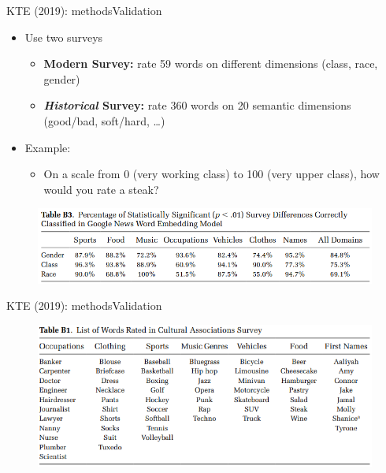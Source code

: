 \documentclass[usenames,dvipsnames,english]{beamer}
\begin{document}
\begin{frame}{KTE (2019): methods}{Validation}
    \begin{itemize}
    \setlength{\itemsep}{1.5em}
        \item Use two surveys
        \begin{itemize}
\vspace{10pt}
        \setlength{\itemsep}{1.2em}
            \item \textbf{Modern Survey:} rate 59 words on different dimensions (class, race, gender)
            \item \textbf{\textit{Historical} Survey:} rate 360 words on 20 semantic dimensions (good/bad, soft/hard, \dots)
        \end{itemize}

        \item Example:
        \begin{itemize}
            \item On a scale from 0 (very working class) to 100 (very upper class), how would you rate a steak?
        \end{itemize}
    \end{itemize}
\begin{figure}
    \centering
    \includegraphics[scale = 0.4]{Images/kte_validationturk.png}
    \end{figure}
\end{frame}
\begin{frame}{KTE (2019): methods}{Validation}
\begin{figure}
    \centering
    \includegraphics[scale = 0.6]{Images/kte_validation1.png}
    \end{figure}
\end{frame}
\end{document}
